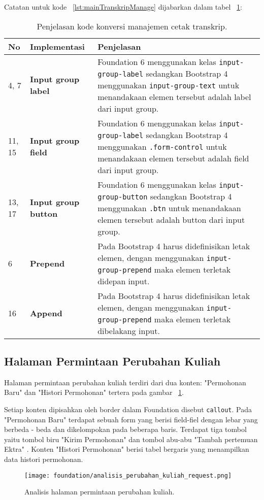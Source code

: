 \noindent Catatan untuk kode ~\ref{lst:mainTranskripManage} dijabarkan dalam tabel ~\ref{tabel:KodeManajemenCetakTranskrip}:
\begin{table}[H]
	\centering
	\caption{Penjelasan kode konversi manajemen cetak transkrip.}
	\begin{tabularx}{\textwidth}{llX}
		\toprule
		No & Implementasi     & Penjelasan \\
		\midrule
		4, 7 & \textbf{Input group label} & Foundation 6 menggunakan kelas \texttt{input-group-label} sedangkan Bootstrap 4 menggunakan  \texttt{input-group-text} untuk menandakaan elemen tersebut adalah label dari input group.\\
		11, 15 & \textbf{Input group field} & Foundation 6 menggunakan kelas \texttt{input-group-label} sedangkan Bootstrap 4 menggunakan  \texttt{.form-control} untuk menandakaan elemen tersebut adalah field dari input group.\\
		13, 17 & \textbf{Input group button} & Foundation 6 menggunakan kelas \texttt{input-group-button} sedangkan Bootstrap 4 menggunakan  \texttt{.btn} untuk menandakaan elemen tersebut adalah button dari input group.\\
		6 & \textbf{Prepend} & Pada Bootstrap 4 harus didefinisikan letak elemen, dengan  menggunakan  \texttt{input-group-prepend} maka elemen terletak didepan input.\\
		16 & \textbf{Append} & Pada Bootstrap 4 harus didefinisikan letak elemen, dengan  menggunakan  \texttt{input-group-prepend} maka elemen terletak dibelakang input.\\
		\bottomrule
	\end{tabularx}%
	\label{tabel:KodeManajemenCetakTranskrip}
\end{table}

\subsection{Halaman Permintaan Perubahan Kuliah}
Halaman permintaan perubahan kuliah terdiri dari dua konten: "Permohonan Baru" dan "Histori Permohonan" tertera pada gambar ~\ref{fig:analisisPermintaanPerubahanKuliah}. 

Setiap konten dipisahkan oleh border dalam Foundation disebut \texttt{callout}. Pada "Permohonan Baru" terdapat sebuah form yang berisi field-fiel dengan lebar yang berbeda - beda dan dikelompokan pada beberapa baris. Terdapat tiga tombol yaitu tombol biru "Kirim Permohonan" dan tombol abu-abu "Tambah pertemuan Ektra" .
Konten "Histori Permohonan" berisi tabel bergaris yang menampilkan data histori permohonan. 
\begin{figure} [H]
	\centering  
	\texttt{[image: foundation/analisis\_perubahan\_kuliah\_request.png]}
	\caption{Analisis halaman permintaan perubahan kuliah.}
	\label{fig:analisisPermintaanPerubahanKuliah}
\end{figure}

